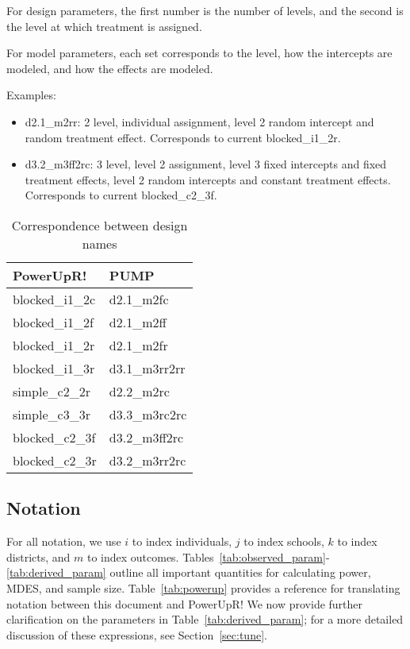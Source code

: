 \documentclass[12pt]{article}
\begin{document}
For design parameters, the first number is the number of levels, and the second is the level at which treatment is assigned.

For model parameters, each set corresponds to the level, how the intercepts are modeled, and how the effects are modeled.

Examples:
\begin{itemize}
\item d2.1\_m2rr: 2 level, individual assignment, level 2 random intercept and random treatment effect.  Corresponds to current blocked\_i1\_2r.
\item d3.2\_m3ff2rc: 3 level, level 2 assignment, level 3 fixed intercepts and fixed treatment effects, level 2 random intercepts and constant treatment effects. Corresponds to current blocked\_c2\_3f.
\end{itemize}

\begin{table}[h!]
\begin{tabular}{l | l}
\textbf{PowerUpR!}	& \textbf{PUMP} \\ \hline
blocked\_i1\_2c 	& d2.1\_m2fc \\
blocked\_i1\_2f 	& d2.1\_m2ff \\
blocked\_i1\_2r 	& d2.1\_m2fr \\
blocked\_i1\_3r 	& d3.1\_m3rr2rr \\
simple\_c2\_2r 		& d2.2\_m2rc \\
simple\_c3\_3r 		& d3.3\_m3rc2rc \\
blocked\_c2\_3f 	& d3.2\_m3ff2rc \\
blocked\_c2\_3r 	& d3.2\_m3rr2rc \\
\end{tabular}
\caption{Correspondence between design names\label{tab:names}}
\end{table}






\subsection{Notation}
\label{sec:notation}

For all notation, we use $i$ to index individuals, $j$ to index schools, $k$ to index districts, and $m$ to index outcomes.
Tables~\ref{tab:observed_param}-\ref{tab:derived_param} outline all important quantities for calculating power, MDES, and sample size.
Table~\ref{tab:powerup} provides a reference for translating notation between this document and PowerUpR!
We now provide further clarification on the parameters in Table~\ref{tab:derived_param}; for a more detailed discussion of these expressions, see Section~\ref{sec:tune}.
\end{document}
